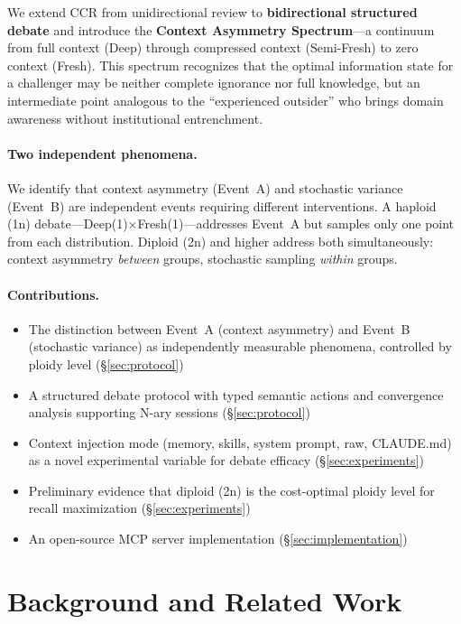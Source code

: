 \documentclass[11pt]{article}
\begin{document}
We extend CCR from unidirectional review to \textbf{bidirectional structured debate} and introduce the \textbf{Context Asymmetry Spectrum}---a continuum from full context (Deep) through compressed context (Semi-Fresh) to zero context (Fresh). This spectrum recognizes that the optimal information state for a challenger may be neither complete ignorance nor full knowledge, but an intermediate point analogous to the ``experienced outsider'' who brings domain awareness without institutional entrenchment.

\paragraph{Two independent phenomena.} We identify that context asymmetry (Event~A) and stochastic variance (Event~B) are independent events requiring different interventions. A haploid (1n) debate---Deep(1)$\times$Fresh(1)---addresses Event~A but samples only one point from each distribution. Diploid (2n) and higher address both simultaneously: context asymmetry \emph{between} groups, stochastic sampling \emph{within} groups.

\paragraph{Contributions.}
\begin{itemize}[leftmargin=1.5em]
  \item The distinction between Event~A (context asymmetry) and Event~B (stochastic variance) as independently measurable phenomena, controlled by ploidy level (\S\ref{sec:protocol})
  \item A structured debate protocol with typed semantic actions and convergence analysis supporting N-ary sessions (\S\ref{sec:protocol})
  \item Context injection mode (memory, skills, system prompt, raw, CLAUDE.md) as a novel experimental variable for debate efficacy (\S\ref{sec:experiments})
  \item Preliminary evidence that diploid (2n) is the cost-optimal ploidy level for recall maximization (\S\ref{sec:experiments})
  \item An open-source MCP server implementation (\S\ref{sec:implementation})
\end{itemize}

\section{Background and Related Work}
\label{sec:related}
\end{document}
